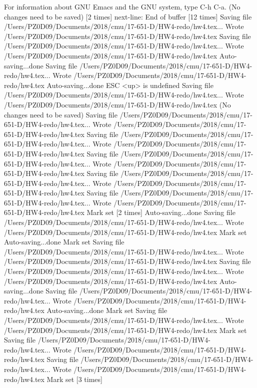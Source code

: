 For information about GNU Emacs and the GNU system, type C-h C-a.
(No changes need to be saved) [2 times]
next-line: End of buffer [12 times]
Saving file /Users/PZ0D09/Documents/2018/cmu/17-651-D/HW4-redo/hw4.tex...
Wrote /Users/PZ0D09/Documents/2018/cmu/17-651-D/HW4-redo/hw4.tex
Saving file /Users/PZ0D09/Documents/2018/cmu/17-651-D/HW4-redo/hw4.tex...
Wrote /Users/PZ0D09/Documents/2018/cmu/17-651-D/HW4-redo/hw4.tex
Auto-saving...done
Saving file /Users/PZ0D09/Documents/2018/cmu/17-651-D/HW4-redo/hw4.tex...
Wrote /Users/PZ0D09/Documents/2018/cmu/17-651-D/HW4-redo/hw4.tex
Auto-saving...done
ESC <up> is undefined
Saving file /Users/PZ0D09/Documents/2018/cmu/17-651-D/HW4-redo/hw4.tex...
Wrote /Users/PZ0D09/Documents/2018/cmu/17-651-D/HW4-redo/hw4.tex
(No changes need to be saved)
Saving file /Users/PZ0D09/Documents/2018/cmu/17-651-D/HW4-redo/hw4.tex...
Wrote /Users/PZ0D09/Documents/2018/cmu/17-651-D/HW4-redo/hw4.tex
Saving file /Users/PZ0D09/Documents/2018/cmu/17-651-D/HW4-redo/hw4.tex...
Wrote /Users/PZ0D09/Documents/2018/cmu/17-651-D/HW4-redo/hw4.tex
Saving file /Users/PZ0D09/Documents/2018/cmu/17-651-D/HW4-redo/hw4.tex...
Wrote /Users/PZ0D09/Documents/2018/cmu/17-651-D/HW4-redo/hw4.tex
Saving file /Users/PZ0D09/Documents/2018/cmu/17-651-D/HW4-redo/hw4.tex...
Wrote /Users/PZ0D09/Documents/2018/cmu/17-651-D/HW4-redo/hw4.tex
Saving file /Users/PZ0D09/Documents/2018/cmu/17-651-D/HW4-redo/hw4.tex...
Wrote /Users/PZ0D09/Documents/2018/cmu/17-651-D/HW4-redo/hw4.tex
Mark set [2 times]
Auto-saving...done
Saving file /Users/PZ0D09/Documents/2018/cmu/17-651-D/HW4-redo/hw4.tex...
Wrote /Users/PZ0D09/Documents/2018/cmu/17-651-D/HW4-redo/hw4.tex
Mark set
Auto-saving...done
Mark set
Saving file /Users/PZ0D09/Documents/2018/cmu/17-651-D/HW4-redo/hw4.tex...
Wrote /Users/PZ0D09/Documents/2018/cmu/17-651-D/HW4-redo/hw4.tex
Saving file /Users/PZ0D09/Documents/2018/cmu/17-651-D/HW4-redo/hw4.tex...
Wrote /Users/PZ0D09/Documents/2018/cmu/17-651-D/HW4-redo/hw4.tex
Auto-saving...done
Saving file /Users/PZ0D09/Documents/2018/cmu/17-651-D/HW4-redo/hw4.tex...
Wrote /Users/PZ0D09/Documents/2018/cmu/17-651-D/HW4-redo/hw4.tex
Auto-saving...done
Mark set
Saving file /Users/PZ0D09/Documents/2018/cmu/17-651-D/HW4-redo/hw4.tex...
Wrote /Users/PZ0D09/Documents/2018/cmu/17-651-D/HW4-redo/hw4.tex
Mark set
Saving file /Users/PZ0D09/Documents/2018/cmu/17-651-D/HW4-redo/hw4.tex...
Wrote /Users/PZ0D09/Documents/2018/cmu/17-651-D/HW4-redo/hw4.tex
Saving file /Users/PZ0D09/Documents/2018/cmu/17-651-D/HW4-redo/hw4.tex...
Wrote /Users/PZ0D09/Documents/2018/cmu/17-651-D/HW4-redo/hw4.tex
Mark set [3 times]
